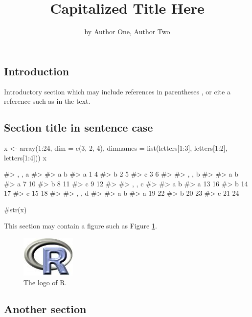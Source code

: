 \title{Capitalized Title Here}
\author{by Author One, Author Two}

\maketitle


\subsection{Introduction}\label{introduction}

Introductory section which may include references in parentheses
\citep{R}, or cite a reference such as \citet{R} in the text.

\subsection{Section title in sentence
case}\label{section-title-in-sentence-case}

\begin{Schunk}
\begin{Sinput}
x <- array(1:24, dim = c(3, 2, 4), dimnames = list(letters[1:3], letters[1:2], letters[1:4]))
x
\end{Sinput}
\begin{Soutput}
#> , , a
#> 
#>   a b
#> a 1 4
#> b 2 5
#> c 3 6
#> 
#> , , b
#> 
#>   a  b
#> a 7 10
#> b 8 11
#> c 9 12
#> 
#> , , c
#> 
#>    a  b
#> a 13 16
#> b 14 17
#> c 15 18
#> 
#> , , d
#> 
#>    a  b
#> a 19 22
#> b 20 23
#> c 21 24
\end{Soutput}
\begin{Sinput}
#{str(x)}
\end{Sinput}
\end{Schunk}

This section may contain a figure such as Figure \ref{figure:rlogo}.

\begin{figure}[htbp]
  \centering
  \includegraphics{Rlogo}
  \caption{The logo of R.}
  \label{figure:rlogo}
\end{figure}

\subsection{Another section}\label{another-section}

